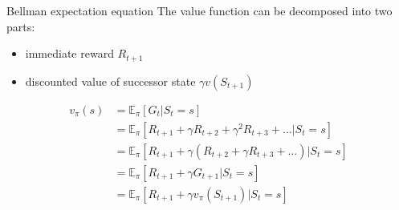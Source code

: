 \bgroup
\begin{frame}{Bellman expectation equation}
The value function can be decomposed into two parts:
\begin{itemize}
\item immediate reward $R_{t+1}$
\item discounted value of successor state $\gamma v(S_{t+1})$
\end{itemize}
\begin{align*}
v_{\pi}(s) &= \mathbb{E}_{\pi}[G_t | S_t = s]\\
&= \mathbb{E}_{\pi} [R_{t+1} + \gamma R_{t+2} + \gamma^2 R_{t+3} + \ldots | S_t = s]\\
&= \mathbb{E}_{\pi}[R_{t+1} + \gamma(R_{t+2} + \gamma R_{t+3} + \ldots )| S_t = s]\\
&= \mathbb{E}_{\pi}[R_{t+1} + \gamma G_{t+1} | S_t = s]\\
&= \mathbb{E}_{\pi}[R_{t+1} + \gamma v_{\pi}(S_{t+1}) | S_t = s]
\end{align*}
\end{frame}
\egroup